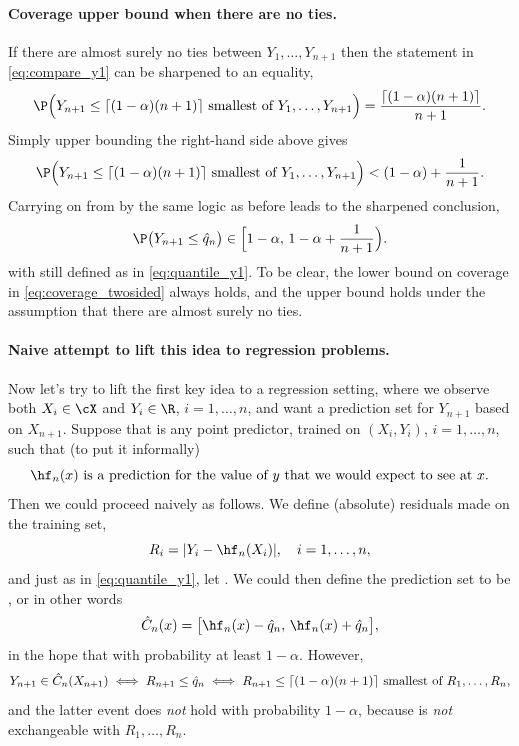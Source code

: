 \documentclass{article}
\begin{document}
\paragraph{Coverage upper bound when there are no ties.}

If there are almost surely no ties between $Y_1,\dots,Y_{n+1}$ then the
statement in \eqref{eq:compare_y1} can be sharpened to an equality, 
\begin{equation}
\label{eq:compare_y3}
\P\Big( \text{$Y_{n+1} \leq \lceil (1-\alpha)(n+1) \rceil$ smallest of
  $Y_1,\dots,Y_{n+1}$} \Big) = \frac{\lceil (1-\alpha)(n+1) \rceil}{n+1}.
\end{equation}
Simply upper bounding the right-hand side above gives
\begin{equation}
\label{eq:compare_y4}
\P\Big( \text{$Y_{n+1} \leq \lceil (1-\alpha)(n+1) \rceil$ smallest of
  $Y_1,\dots,Y_{n+1}$} \Big) < (1-\alpha) + \frac{1}{n+1}.
\end{equation}
Carrying on from by the same logic as before leads to the sharpened conclusion, 
\begin{equation}
\label{eq:coverage_twosided}
\P\big( Y_{n+1} \leq \hq_n \big) \in \Big[ 1-\alpha, \, 1-\alpha + \frac{1}{n+1}
\Big).  
\end{equation}
with  still defined as in \eqref{eq:quantile_y1}. To be clear,
the lower bound on coverage in \eqref{eq:coverage_twosided} always holds, and
the upper bound holds under the assumption that there are almost surely no ties.  

\paragraph{Naive attempt to lift this idea to regression problems.} 

Now let's try to lift the first key idea to a regression setting, where we
observe both $X_i \in \cX$ and $Y_i \in \R$, $i=1,\dots,n$, and want a
prediction set for $Y_{n+1}$ based on $X_{n+1}$. Suppose that  is  
any point predictor, trained on $(X_i,Y_i)$, $i=1,\dots,n$, such that (to put it 
informally)  
\[
\text{$\hf_n(x)$ is a prediction for the value of $y$ that we would expect to
  see at $x$.}  
\]
Then we could proceed naively as follows. We define (absolute) residuals made on 
the training set,     
\[
R_i = |Y_i - \hf_n(X_i)|, \quad i=1,\dots,n,
\]
and just as in \eqref{eq:quantile_y1}, let . We could then define
the prediction set to be , or in other words
\[
\hC_n(x) = \big[ \hf_n(x) - \hq_n, \, \hf_n(x) + \hq_n \big], 
\]
in the hope that  with probability at least
$1-\alpha$. However, 
\[
Y_{n+1} \in \hat{C}_n(X_{n+1}) 
\iff R_{n+1} \leq \hat{q}_n 
\iff \text{$R_{n+1} \leq \lceil (1-\alpha)(n+1) \rceil$ smallest of
  $R_1,\dots,R_n$},   
\]
and the latter event does \emph{not} hold with probability $1-\alpha$, because
 is \emph{not} exchangeable with 
$R_1,\dots,R_n$. 
\end{document}
